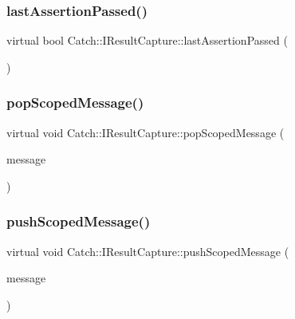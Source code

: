 \mbox{\label{struct_catch_1_1_i_result_capture_a973435fbdcb2f6f07a0ec5719a01e956}} 
\subsubsection{lastAssertionPassed()}
{\footnotesize\ttfamily virtual bool Catch\+::\+I\+Result\+Capture\+::last\+Assertion\+Passed (\begin{DoxyParamCaption}{ }\end{DoxyParamCaption})\hspace{0.3cm}{\ttfamily [pure virtual]}}

\mbox{\label{struct_catch_1_1_i_result_capture_a42bcb13276706bf8c3ce081ce16d37fd}} 
\subsubsection{popScopedMessage()}
{\footnotesize\ttfamily virtual void Catch\+::\+I\+Result\+Capture\+::pop\+Scoped\+Message (\begin{DoxyParamCaption}\item[{\textbf{ Message\+Info} const \&}]{message }\end{DoxyParamCaption})\hspace{0.3cm}{\ttfamily [pure virtual]}}

\mbox{\label{struct_catch_1_1_i_result_capture_a91d154c1e087e383dcde5aad95cb6a05}} 
\subsubsection{pushScopedMessage()}
{\footnotesize\ttfamily virtual void Catch\+::\+I\+Result\+Capture\+::push\+Scoped\+Message (\begin{DoxyParamCaption}\item[{\textbf{ Message\+Info} const \&}]{message }\end{DoxyParamCaption})\hspace{0.3cm}{\ttfamily [pure virtual]}}

